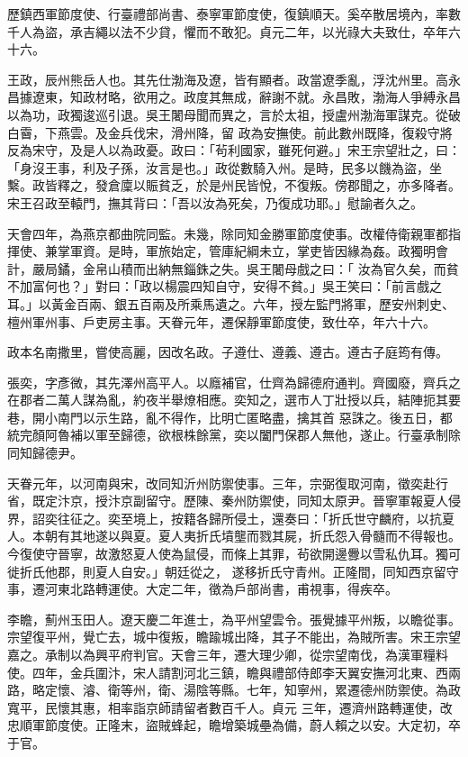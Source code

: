 \begin{pinyinscope}
 歷鎮西軍節度使、行臺禮部尚書、泰寧軍節度使，復鎮順天。奚卒散居境內，率數千人為盜，承吉繩以法不少貸，懼而不敢犯。貞元二年，以光祿大夫致仕，卒年六十六。



 王政，辰州熊岳人也。其先仕渤海及遼，皆有顯者。政當遼季亂，浮沈州里。高永昌據遼東，知政材略，欲用之。政度其無成，辭謝不就。永昌敗，渤海人爭縛永昌以為功，政獨逡巡引退。吳王闍母聞而異之，言於太祖，授盧州渤海軍謀克。從破白霫，下燕雲。及金兵伐宋，滑州降，留
 政為安撫使。前此數州既降，復殺守將反為宋守，及是人以為政憂。政曰：「茍利國家，雖死何避。」宋王宗望壯之，曰：「身沒王事，利及子孫，汝言是也。」政從數騎入州。是時，民多以饑為盜，坐繫。政皆釋之，發倉廩以賑貧乏，於是州民皆悅，不復叛。傍郡聞之，亦多降者。宋王召政至轅門，撫其背曰：「吾以汝為死矣，乃復成功耶。」慰諭者久之。



 天會四年，為燕京都曲院同監。未幾，除同知金勝軍節度使事。改權侍衛親軍都指揮使、兼掌軍資。是時，軍旅始定，管庫紀綱未立，掌吏皆因緣為姦。政獨明會計，嚴局鐍，金帛山積而出納無錙銖之失。吳王闍母戲之曰：「
 汝為官久矣，而貧不加富何也？」對曰：「政以楊震四知自守，安得不貧。」吳王笑曰：「前言戲之耳。」以黃金百兩、銀五百兩及所乘馬遺之。六年，授左監門將軍，歷安州刺史、檀州軍州事、戶吏房主事。天眷元年，遷保靜軍節度使，致仕卒，年六十六。



 政本名南撒里，嘗使高麗，因改名政。子遵仕、遵義、遵古。遵古子庭筠有傳。



 張奕，字彥微，其先澤州高平人。以廕補官，仕齊為歸德府通判。齊國廢，齊兵之在郡者二萬人謀為亂，約夜半舉燎相應。奕知之，選市人丁壯授以兵，結陣扼其要巷，開小南門以示生路，亂不得作，比明亡匿略盡，擒其首
 惡誅之。後五日，都統完顏阿魯補以軍至歸德，欲根株餘黨，奕以闔門保郡人無他，遂止。行臺承制除同知歸德尹。



 天眷元年，以河南與宋，改同知沂州防禦使事。三年，宗弼復取河南，徵奕赴行省，既定汴京，授汴京副留守。歷陳、秦州防禦使，同知太原尹。晉寧軍報夏人侵界，詔奕往征之。奕至境上，按籍各歸所侵土，還奏曰：「折氏世守麟府，以抗夏人。本朝有其地遂以與夏。夏人夷折氏墳壟而戮其屍，折氏怨入骨髓而不得報也。今復使守晉寧，故激怒夏人使為鼠侵，而條上其罪，茍欲開邊釁以雪私仇耳。獨可徙折氏他郡，則夏人自安。」朝廷從之，
 遂移折氏守青州。正隆間，同知西京留守事，遷河東北路轉運使。大定二年，徵為戶部尚書，甫視事，得疾卒。



 李瞻，薊州玉田人。遼天慶二年進士，為平州望雲令。張覺據平州叛，以瞻從事。宗望復平州，覺亡去，城中復叛，瞻踰城出降，其子不能出，為賊所害。宋王宗望嘉之。承制以為興平府判官。天會三年，遷大理少卿，從宗望南伐，為漢軍糧料使。四年，金兵圍汴，宋人請割河北三鎮，瞻與禮部侍郎李天翼安撫河北東、西兩路，略定懷、濬、衛等州，衛、湯陰等縣。七年，知寧州，累遷德州防禦使。為政寬平，民懷其惠，相率詣京師請留者數百千人。貞元
 三年，遷濟州路轉運使，改忠順軍節度使。正隆末，盜賊蜂起，瞻增築城壘為備，蔚人賴之以安。大定初，卒于官。




\end{pinyinscope}
